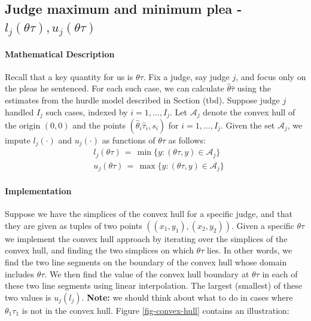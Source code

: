 \documentclass[11pt]{article}
\theoremstyle{ModifiedStyle}
\begin{document}
  \subsection{Judge maximum and minimum plea - $l_j(\theta \tau),u_j(\theta \tau)$}\label{convex_hull-estimation}
    \paragraph{Mathematical Description} Recall that a key quantity for us is $\theta\tau$. Fix a judge, say judge $j$, and focus only on the pleas he sentenced. For each such case, we can calculate $\hat{\theta}\hat{\tau}$ using the estimates from the hurdle model described in Section (tbd). Suppose judge $j$ handled $I_j$ such cases, indexed by $i=1,\ldots,I_j$. Let $\mathcal{A}_j$ denote the convex hull of the origin $(0,0)$ and the points $(\hat{\theta}_i\hat{\tau}_i,s_i)$ for $i=1,\ldots,I_j$. Given the set $\mathcal{A}_j$, we impute $l_j(\cdot)$ and $u_j(\cdot)$ as functions of $\theta\tau$ as follows:
		\begin{align*}
			&l_j(\theta\tau) \,=\, \min\{y:(\theta\tau,y)\in\mathcal{A}_j \} \\
			&u_j(\theta\tau) \,=\, \max\{y:(\theta\tau,y)\in\mathcal{A}_j \}
		\end{align*}

     \paragraph{Implementation}
     Suppose we have the simplices of the convex hull for a specific judge, and that they are given as tuples of two points $((x_1,y_1),(x_2,y_2))$. Given a specific $\theta \tau$ we implement the convex hull approach by iterating over the simplices of the convex hull, and finding the two simplices on which $\theta \tau$ lies. In other words, we find the two line segments on the boundary of the convex hull whose domain includes $\theta \tau$. We then find the value of the convex hull boundary at $\theta \tau$ in each of these two line segments using linear interpolation. The largest (smallest) of these two values is $u_j (l_j)$. \textbf{Note:} we should think about what to do in cases where $\theta_1 \tau_1$ is not in the convex hull. Figure \ref{fig-convex-hull} contains an illustration:
\end{document}
